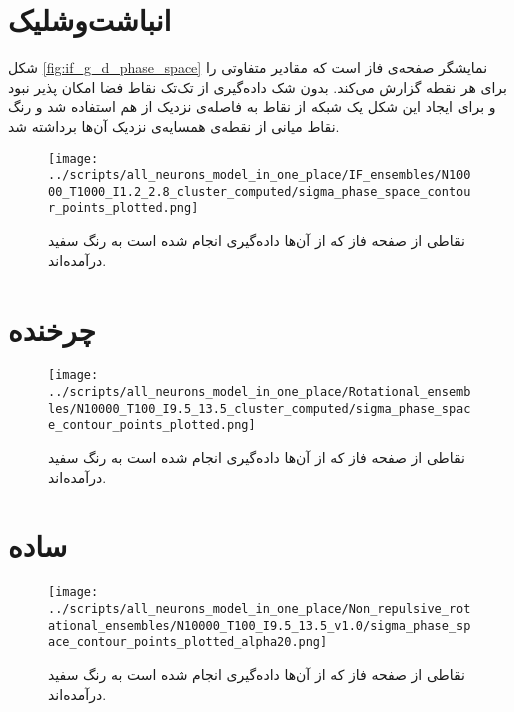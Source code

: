 \section{انباشت‌وشلیک} \label{appendix:phase_sampling_if}
شکل \ref{fig:if_g_d_phase_space} نمایشگر صفحه‌ی فاز است که مقادیر متفاوتی را برای هر نقطه گزارش می‌کند. بدون شک داده‌گیری از تک‌تک نقاط فضا امکان پذیر نبود و برای ایجاد این شکل یک شبکه از نقاط به فاصله‌ی نزدیک از هم استفاده شد و رنگ نقاط میانی از نقطه‌ی همسایه‌ی نزدیک آن‌ها برداشته شد.
\begin{figure}[h]
	\texttt{[image: ../scripts/all\_neurons\_model\_in\_one\_place/IF\_ensembles/N10000\_T1000\_I1.2\_2.8\_cluster\_computed/sigma\_phase\_space\_contour\_points\_plotted.png]}
	\caption{نقاطی از صفحه فاز که از آن‌ها داده‌گیری انجام شده است به رنگ سفید درآمده‌اند.}
	\label{fig:if_g_d_phase_if_space_points_plotted}
\end{figure}

\section{چرخنده} \label{appendix:phase_samplingـrotational}
\begin{figure}[h]
	\texttt{[image: ../scripts/all\_neurons\_model\_in\_one\_place/Rotational\_ensembles/N10000\_T100\_I9.5\_13.5\_cluster\_computed/sigma\_phase\_space\_contour\_points\_plotted.png]}
	\caption{نقاطی از صفحه فاز که از آن‌ها داده‌گیری انجام شده است به رنگ سفید درآمده‌اند.}
	\label{fig:if_g_d_phase_rotational_space_points_plotted}
\end{figure}

\section{ساده} \label{appendix:phase_sampling_simple}
\begin{figure}[h]
	\texttt{[image: ../scripts/all\_neurons\_model\_in\_one\_place/Non\_repulsive\_rotational\_ensembles/N10000\_T100\_I9.5\_13.5\_v1.0/sigma\_phase\_space\_contour\_points\_plotted\_alpha20.png]}
	\caption{نقاطی از صفحه فاز که از آن‌ها داده‌گیری انجام شده است به رنگ سفید درآمده‌اند.}
	\label{fig:if_g_d_phase_space_Non_repulsive_points_plotted}
\end{figure}
